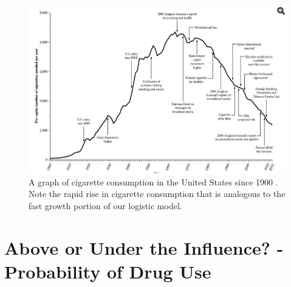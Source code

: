 \documentclass[12pt]{article}
\begin{document}
\begin{figure}
    \centering
    \includegraphics[width=14cm]{historicalcigarette}
    \caption{A graph of cigarette consumption in the United States since 1900 \cite{cdcTeenVaping}. Note the rapid rise in cigarette consumption that is analogous to the fast growth portion of our logistic model.}
    \label{fig:cigGrowth}
\end{figure}

\section{Above or Under the Influence? - Probability of Drug Use}
\end{document}
